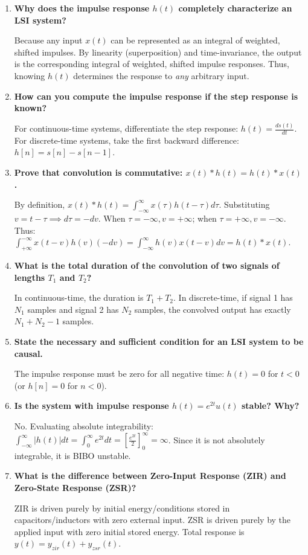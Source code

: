 \documentclass[12pt,a4paper]{article}
\newcommand{\Q}[1]{\textbf{#1}\par\noindent\ignorespaces}
\begin{document}
\begin{tcolorbox}[exambox, title={\textbf{Frequently Asked / Viva Questions}}]
\begin{enumerate}[topsep=0pt, label=\textbf{Q\arabic*.}, itemsep=5pt]
  \item \Q{Why does the impulse response $h(t)$ completely characterize an LSI system?}
  Because any input $x(t)$ can be represented as an integral of weighted, shifted impulses. By linearity (superposition) and time-invariance, the output is the corresponding integral of weighted, shifted impulse responses. Thus, knowing $h(t)$ determines the response to \textit{any} arbitrary input.

  \item \Q{How can you compute the impulse response if the step response is known?}
  For continuous-time systems, differentiate the step response: $h(t) = \frac{ds(t)}{dt}$. For discrete-time systems, take the first backward difference: $h[n] = s[n] - s[n-1]$.

  \item \Q{Prove that convolution is commutative: $x(t) * h(t) = h(t) * x(t)$.}
  By definition, $x(t) * h(t) = \int_{-\infty}^{\infty} x(\tau) h(t - \tau) d\tau$. Substituting $v = t - \tau \implies d\tau = -dv$. When $\tau = -\infty, v = +\infty$; when $\tau = +\infty, v = -\infty$. Thus:
  $\int_{+\infty}^{-\infty} x(t - v) h(v) (-dv) = \int_{-\infty}^{\infty} h(v) x(t - v) dv = h(t) * x(t)$.

  \item \Q{What is the total duration of the convolution of two signals of lengths $T_1$ and $T_2$?}
  In continuous-time, the duration is $T_1 + T_2$. In discrete-time, if signal 1 has $N_1$ samples and signal 2 has $N_2$ samples, the convolved output has exactly $N_1 + N_2 - 1$ samples.

  \item \Q{State the necessary and sufficient condition for an LSI system to be causal.}
  The impulse response must be zero for all negative time: $h(t) = 0$ for $t < 0$ (or $h[n] = 0$ for $n < 0$).

  \item \Q{Is the system with impulse response $h(t) = e^{2t} u(t)$ stable? Why?}
  No. Evaluating absolute integrability: $\int_{-\infty}^\infty |h(t)|dt = \int_0^\infty e^{2t} dt = \left[\frac{e^{2t}}{2}\right]_0^\infty = \infty$. Since it is not absolutely integrable, it is BIBO unstable.

  \item \Q{What is the difference between Zero-Input Response (ZIR) and Zero-State Response (ZSR)?}
  ZIR is driven purely by initial energy/conditions stored in capacitors/inductors with zero external input. ZSR is driven purely by the applied input with zero initial stored energy. Total response is $y(t) = y_{zir}(t) + y_{zsr}(t)$.


\end{enumerate}
\end{tcolorbox}
\end{document}
